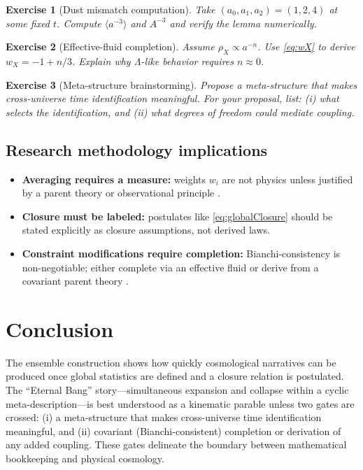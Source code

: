 \documentclass[11pt]{article}
\newtheorem{exercise}{Exercise}
\begin{document}
\begin{exercise}[Dust mismatch computation]
Take $(a_0,a_1,a_2)=(1,2,4)$ at some fixed $t$. Compute $\langle a^{-3}\rangle$ and $A^{-3}$ and verify the lemma numerically.
\end{exercise}

\begin{exercise}[Effective-fluid completion]
Assume $\rho_X\propto a^{-n}$. Use \eqref{eq:wX} to derive $w_X=-1+n/3$. Explain why $\Lambda$-like behavior requires $n\approx 0$.
\end{exercise}

\begin{exercise}[Meta-structure brainstorming]
Propose a meta-structure that makes cross-universe time identification meaningful. For your proposal, list: (i) what selects the identification, and (ii) what degrees of freedom could mediate coupling.
\end{exercise}

\subsection{Research methodology implications}

\begin{itemize}[leftmargin=1.2em]
\item \textbf{Averaging requires a measure:} weights $w_i$ are not physics unless justified by a parent theory or observational principle \citep{Buchert2000,ClarksonEtAl2011}.
\item \textbf{Closure must be labeled:} postulates like \eqref{eq:globalClosure} should be stated explicitly as closure assumptions, not derived laws.
\item \textbf{Constraint modifications require completion:} Bianchi-consistency is non-negotiable; either complete via an effective fluid or derive from a covariant parent theory \citep{Wald1984}.
\end{itemize}

\section{Conclusion}

The ensemble construction shows how quickly cosmological narratives can be produced once global statistics are defined and a closure relation is postulated. The ``Eternal Bang'' story---simultaneous expansion and collapse within a cyclic meta-description---is best understood as a kinematic parable unless two gates are crossed: (i) a meta-structure that makes cross-universe time identification meaningful, and (ii) covariant (Bianchi-consistent) completion or derivation of any added coupling. These gates delineate the boundary between mathematical bookkeeping and physical cosmology.
\end{document}

